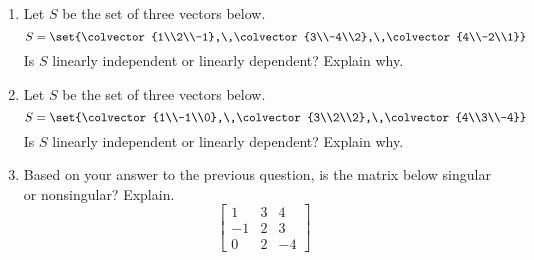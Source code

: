 \begin{enumerate}
%
\item Let  $S$  be the set of three vectors below. 
%
\begin{equation*}
S=\set{\colvector{1\\2\\-1},\,\colvector{3\\-4\\2},\,\colvector{4\\-2\\1}}
\end{equation*}
%
Is  $S$  linearly independent or linearly dependent?  Explain why.
%
\item  Let  $S$  be the set of  three vectors below. 
%
\begin{equation*}
S=\set{\colvector{1\\-1\\0},\,\colvector{3\\2\\2},\,\colvector{4\\3\\-4}}
\end{equation*}
%
Is  $S$  linearly independent or linearly dependent?  Explain why.
%
\item Based on your answer to the previous question, is the matrix below singular or nonsingular?  Explain.
%
\begin{equation*}
\begin{bmatrix}
 1  &3  &4\\
-1  &2  &3\\
 0  &2 &-4
 \end{bmatrix}
\end{equation*}
%
\end{enumerate}
